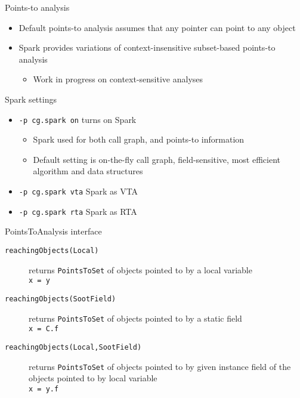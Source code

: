 \begin{slide}{Points-to analysis}
\begin{itemize}
\item Default points-to analysis assumes that any pointer can point to any object
\item Spark provides variations of context-insensitive subset-based
points-to analysis
\begin{itemize}
\item Work in progress on context-sensitive analyses
\end{itemize}
\end{itemize}
\end{slide}

\begin{slide}{Spark settings}
\begin{itemize}
\item \texttt{-p cg.spark on} turns on Spark
\begin{itemize}
\item Spark used for both call graph, and points-to information
\item Default setting is on-the-fly call graph, field-sensitive,
most efficient algorithm and data structures
\end{itemize}
\item \texttt{-p cg.spark vta} Spark as VTA
\item \texttt{-p cg.spark rta} Spark as RTA
\end{itemize}
\end{slide}

\begin{slide}{PointsToAnalysis interface}
\begin{description}
\item
[\texttt{\small reachingObjects(Local)}]
returns {\tt PointsToSet} of objects pointed to by a local variable\\
{\tt x = y}

\item
[\texttt{\small reachingObjects(SootField)}]
returns {\tt PointsToSet} of objects pointed to by a static field\\
{\tt x = C.f}

\item
[\texttt{\small reachingObjects(Local,SootField)}]
returns {\tt PointsToSet} of objects pointed to by given instance field
of the objects pointed to by local variable\\
{\tt x = y.f}
\end{description}
\end{slide}

